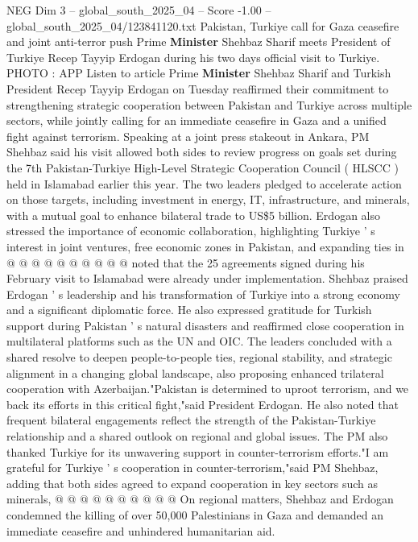 \begin{textsample}{NEG Dim 3 – global\_south\_2025\_04 – Score -1.00 – global\_south\_2025\_04/123841120.txt}  \label{ex:f3_neg_344}
Pakistan, Turkiye call for Gaza ceasefire and joint anti-terror push Prime \textbf{Minister} Shehbaz Sharif meets President of Turkiye Recep Tayyip Erdogan during his two days official visit to Turkiye.
PHOTO : APP Listen to article Prime \textbf{Minister} Shehbaz Sharif and Turkish President Recep Tayyip Erdogan on Tuesday reaffirmed their commitment to strengthening strategic cooperation between Pakistan and Turkiye across multiple sectors, while jointly calling for an immediate ceasefire in Gaza and a unified fight against terrorism.
Speaking at a joint press stakeout in Ankara, PM Shehbaz said his visit allowed both sides to review progress on goals set during the 7th Pakistan-Turkiye High-Level Strategic Cooperation Council ( HLSCC ) held in Islamabad earlier this year.
The two leaders pledged to accelerate action on those targets, including investment in energy, IT, infrastructure, and minerals, with a mutual goal to enhance bilateral trade to US\$5 billion.
Erdogan also stressed the importance of economic collaboration, highlighting Turkiye ' s interest in joint ventures, free economic zones in Pakistan, and expanding ties in @ @ @ @ @ @ @ @ @ @ noted that the 25 agreements signed during his February visit to Islamabad were already under implementation.
Shehbaz praised Erdogan ' s leadership and his transformation of Turkiye into a strong economy and a significant diplomatic force.
He also expressed gratitude for Turkish support during Pakistan ' s natural disasters and reaffirmed close cooperation in multilateral platforms such as the UN and OIC.
The leaders concluded with a shared resolve to deepen people-to-people ties, regional stability, and strategic alignment in a changing global landscape, also proposing enhanced trilateral cooperation with Azerbaijan."Pakistan is determined to uproot terrorism, and we back its efforts in this critical fight,"said President Erdogan.
He also noted that frequent bilateral engagements reflect the strength of the Pakistan-Turkiye relationship and a shared outlook on regional and global issues.
The PM also thanked Turkiye for its unwavering support in counter-terrorism efforts."I am grateful for Turkiye ' s cooperation in counter-terrorism,"said PM Shehbaz, adding that both sides agreed to expand cooperation in key sectors such as minerals, @ @ @ @ @ @ @ @ @ @ On regional matters, Shehbaz and Erdogan condemned the killing of over 50,000 Palestinians in Gaza and demanded an immediate ceasefire and unhindered humanitarian aid.

\end{textsample}
